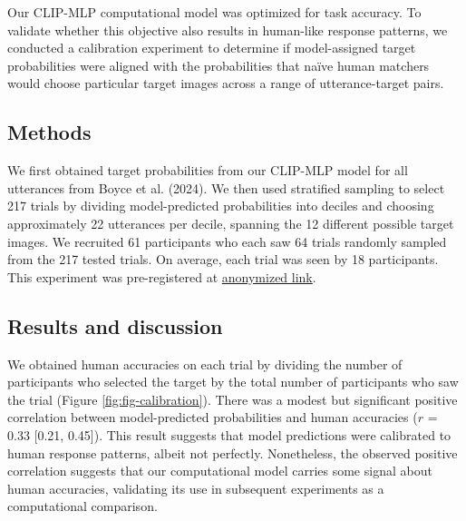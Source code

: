 \documentclass[10pt, letterpaper]{article}
\begin{document}
Our CLIP-MLP computational model was optimized for task accuracy. To
validate whether this objective also results in human-like response
patterns, we conducted a calibration experiment to determine if
model-assigned target probabilities were aligned with the probabilities
that naïve human matchers would choose particular target images across a
range of utterance-target pairs.

\subsection{Methods}\label{methods}

We first obtained target probabilities from our CLIP-MLP model for all
utterances from Boyce et al. (2024). We then used stratified sampling to
select 217 trials by dividing model-predicted probabilities into deciles
and choosing approximately 22 utterances per decile, spanning the 12
different possible target images. We recruited 61 participants who each
saw 64 trials randomly sampled from the 217 tested trials. On average,
each trial was seen by 18 participants. This experiment was
pre-registered at
\href{https://osf.io/6pv5e/?view_only=0bc61ddeda83493c844ca554f463ba85}{anonymized
link}.

\subsection{Results and discussion}\label{results-and-discussion}

We obtained human accuracies on each trial by dividing the number of
participants who selected the target by the total number of participants
who saw the trial (Figure \ref{fig:fig-calibration}). There was a modest
but significant positive correlation between model-predicted
probabilities and human accuracies (\(r\) = 0.33 {[}0.21, 0.45{]}). This
result suggests that model predictions were calibrated to human response
patterns, albeit not perfectly. Nonetheless, the observed positive
correlation suggests that our computational model carries some signal
about human accuracies, validating its use in subsequent experiments as
a computational comparison.
\end{document}
